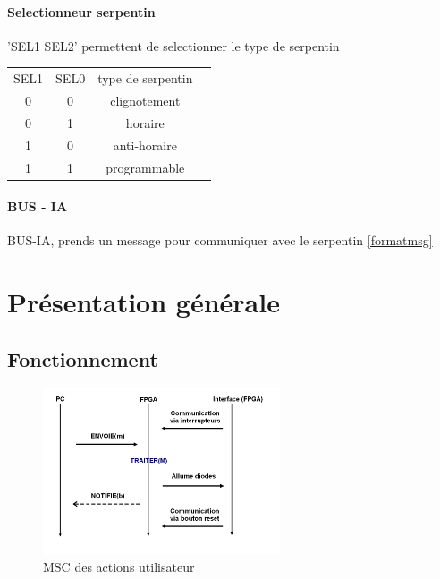 \documentclass[10pt]{article}
\begin{document}
    \paragraph{Selectionneur serpentin} 'SEL1 SEL2' permettent de selectionner le type de serpentin
    
    \begin{table}[h]
        \centering
        \begin{tabular}{cccc}
                SEL1 & SEL0 & type de serpentin \\
                  0  &   0  &    clignotement   \\
                  0  &   1  &    horaire        \\
                  1  &   0  &    anti-horaire   \\
                  1  &   1  &    programmable   \\
        \end{tabular}
    \end{table}
        
        
    \paragraph{BUS - IA} BUS-IA, prends un message pour communiquer avec le serpentin \ref{formatmsg}

    \newpage
    \section{Présentation générale}
    
        \subsection{Fonctionnement}
        \begin{figure}[h!]
            \includegraphics[width=7cm]{fonctionnement.png}
            \caption{MSC des actions utilisateur}
        \end{figure}
        
\end{document}
